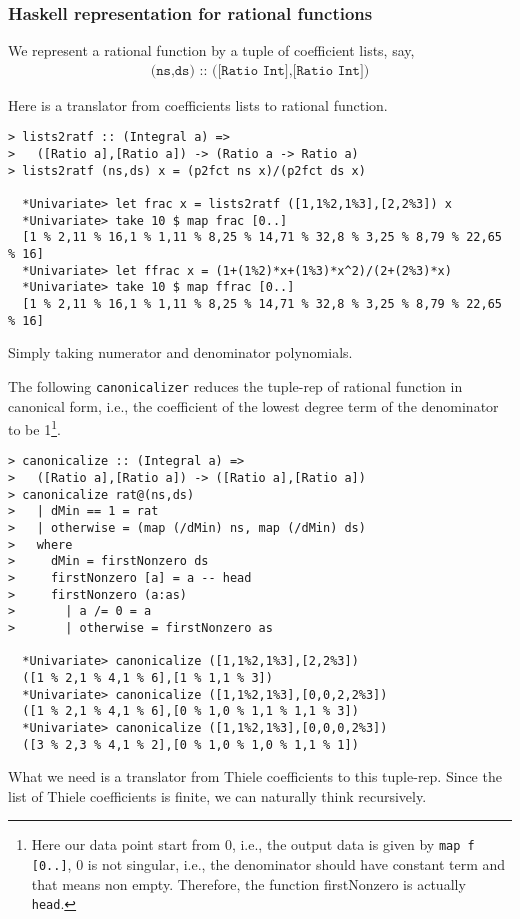\documentclass[11pt]{book}
\begin{document}
\subsubsection{Haskell representation for rational functions}
We represent a rational function by a tuple of coefficient lists, say,
\begin{eqnarray}
\texttt{(ns,ds) :: ([Ratio Int],[Ratio Int])}
\end{eqnarray}

Here is a translator from coefficients lists to rational function.
\begin{verbatim}
> lists2ratf :: (Integral a) => 
>   ([Ratio a],[Ratio a]) -> (Ratio a -> Ratio a)
> lists2ratf (ns,ds) x = (p2fct ns x)/(p2fct ds x)

  *Univariate> let frac x = lists2ratf ([1,1%2,1%3],[2,2%3]) x
  *Univariate> take 10 $ map frac [0..]
  [1 % 2,11 % 16,1 % 1,11 % 8,25 % 14,71 % 32,8 % 3,25 % 8,79 % 22,65 % 16]
  *Univariate> let ffrac x = (1+(1%2)*x+(1%3)*x^2)/(2+(2%3)*x)
  *Univariate> take 10 $ map ffrac [0..]
  [1 % 2,11 % 16,1 % 1,11 % 8,25 % 14,71 % 32,8 % 3,25 % 8,79 % 22,65 % 16]  
\end{verbatim}
Simply taking numerator and denominator polynomials.

The following \texttt{canonicalizer} reduces the tuple-rep of rational function in canonical form, i.e., the coefficient of the lowest degree term of the denominator to be 1\footnote{
Here our data point start from 0, i.e., the output data is given by \texttt{map f [0..]}, 0 is not singular, i.e., the denominator should have constant term and that means non empty.
Therefore, the function firstNonzero is actually \texttt{head}.
}.
\begin{verbatim}
> canonicalize :: (Integral a) => 
>   ([Ratio a],[Ratio a]) -> ([Ratio a],[Ratio a])
> canonicalize rat@(ns,ds)
>   | dMin == 1 = rat
>   | otherwise = (map (/dMin) ns, map (/dMin) ds)
>   where
>     dMin = firstNonzero ds
>     firstNonzero [a] = a -- head
>     firstNonzero (a:as)
>       | a /= 0 = a
>       | otherwise = firstNonzero as

  *Univariate> canonicalize ([1,1%2,1%3],[2,2%3])
  ([1 % 2,1 % 4,1 % 6],[1 % 1,1 % 3])
  *Univariate> canonicalize ([1,1%2,1%3],[0,0,2,2%3])
  ([1 % 2,1 % 4,1 % 6],[0 % 1,0 % 1,1 % 1,1 % 3])
  *Univariate> canonicalize ([1,1%2,1%3],[0,0,0,2%3])
  ([3 % 2,3 % 4,1 % 2],[0 % 1,0 % 1,0 % 1,1 % 1])
\end{verbatim}

What we need is a translator from Thiele coefficients to this tuple-rep.
Since the list of Thiele coefficients is finite, we can naturally think recursively.
\end{document}
